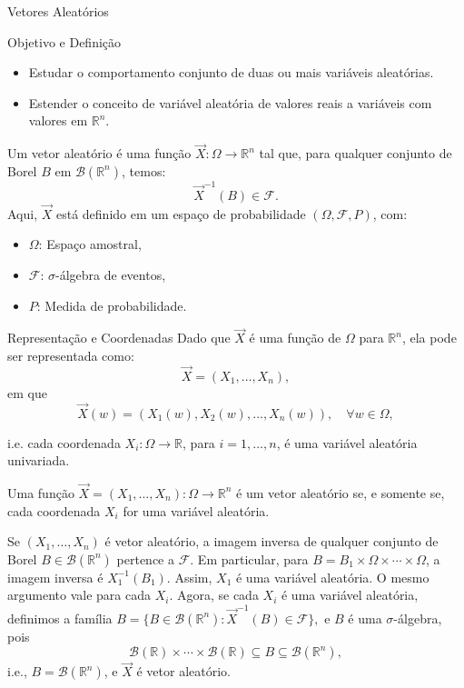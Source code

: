 	
%	
\begin{frame}{Vetores Aleatórios}
	
	\begin{block}{Objetivo e Definição}
		\begin{itemize}		
\item Estudar o comportamento conjunto de duas ou mais variáveis aleatórias.
\item  Estender o conceito de variável aleatória de valores reais a variáveis com valores em $\mathbb{R}^n$.

\end{itemize}		
\end{block}
\begin{defi}
	Um vetor aleatório é uma função $\Vec{X}:\Omega \rightarrow \mathbb{R}^n$ tal que, para qualquer conjunto de Borel $B$ em $\mathcal{B}(\mathbb{R}^n)$, temos:
		\[
		\Vec{X}^{-1}(B) \in \mathcal{F}.
		\]
	Aqui, $\Vec{X}$ está definido em um espaço de probabilidade $(\Omega, \mathcal{F}, P)$, com:
		\begin{itemize}
			\item $\Omega$: Espaço amostral,
			\item $\mathcal{F}$: $\sigma$-álgebra de eventos,
			\item $P$: Medida de probabilidade.
		\end{itemize}
		\end{defi}
\end{frame}

\begin{frame}{Representação e Coordenadas}
	Dado que $\Vec{X}$ é uma função de $\Omega$ para $\mathbb{R}^n$, ela pode ser representada como:
	\[
	\Vec{X} = (X_1, \ldots, X_n),
	\]
em que 
	\[
	\Vec{X}(w) = (X_1(w), X_2(w), \ldots, X_n(w)), \quad \forall w \in \Omega, 
	\]
	
i.e. cada coordenada $X_i:\Omega \rightarrow \mathbb{R}$, para $i = 1, \ldots, n$, é uma variável aleatória univariada.
	
\begin{prop}
	Uma função $\Vec{X}=(X_1, \ldots, X_n): \Omega \rightarrow \mathbb{R}^n$ é um vetor aleatório se, e somente se, cada coordenada $X_i$ for uma variável aleatória.
\end{prop}	

	\begin{prova}
Se $(X_1, \ldots, X_n)$ é vetor aleatório, a imagem inversa de qualquer conjunto de Borel $B \in \mathcal{B}(\mathbb{R}^n)$ pertence a $\mathcal{F}$. Em particular, para $B = B_1 \times \Omega \times \cdots \times \Omega$, a imagem inversa é $X_1^{-1}(B_1)$. Assim, $X_1$ é uma variável aleatória. O mesmo argumento vale para cada $X_i$. Agora, se cada $X_i$ é uma variável aleatória, definimos a família $B = \{B \in \mathcal{B}(\mathbb{R}^n) : \Vec{X}^{-1}(B) \in \mathcal{F}\},$ e 
$B$ é uma $\sigma$-álgebra, pois
\[
\mathcal{B}(\mathbb{R}) \times \cdots \times \mathcal{B}(\mathbb{R}) \subseteq B \subseteq \mathcal{B}(\mathbb{R}^n),
\] i.e., $B = \mathcal{B}(\mathbb{R}^n)$, e $\Vec{X}$ é vetor aleatório.
	\end{prova}	
\end{frame}



